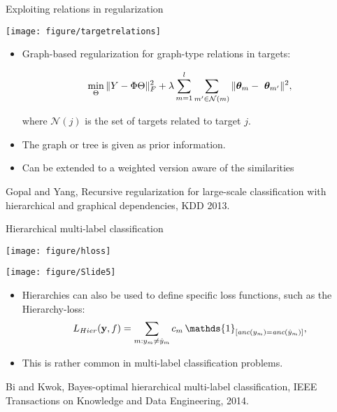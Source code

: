 \documentclass[11pt,compress,t,notes=noshow, xcolor=table]{beamer}
\begin{document}
\begin{frame}{Exploiting relations in regularization}

	\begin{center}
		\texttt{[image: figure/targetrelations]}
	\end{center} 

	\begin{itemize}
		\item Graph-based regularization for graph-type relations in targets: 

		\begin{equation*}
			\min_\Theta \|Y - \Phi \Theta \|^2_F + \lambda \sum_{m=1}^l \sum_{m' \in \mathcal{N}(m)} \|\thetab_m - \ \thetab_{m'}\|^2,
		\end{equation*}

		where $\mathcal{N}(j)$ is the set of targets related to target $j.$
        \item The graph or tree is given as prior information.
		
		\item Can be extended to a weighted version aware of the similarities
	
	\end{itemize}

	{\tiny Gopal and Yang, Recursive regularization for large-scale classification with hierarchical and graphical dependencies, KDD 2013.}
\end{frame}

\begin{frame}{Hierarchical multi-label classification}
	
	\begin{minipage}{0.60\textwidth}  
        \centering
        \texttt{[image: figure/hloss]}
    \end{minipage}
    \hfill
    \begin{minipage}{0.39\textwidth}    
        \centering
		\texttt{[image: figure/Slide5]}
    \end{minipage}
    
    \begin{itemize}
        \item  Hierarchies can also be used to define specific loss functions, such as the Hierarchy-loss: $$L_{Hier}(\yv, f) = \sum_{m: y_m \neq \hat{y}_m} c_m \, \mathds{1}_{ [\textit{anc}(y_m) = \textit{anc}(\hat{y}_m)]  },$$
        \item This is rather common in multi-label classification problems.
    \end{itemize}
    
	{\tiny Bi and Kwok, Bayes-optimal hierarchical multi-label classification, IEEE Transactions on Knowledge and Data Engineering, 2014.}

\end{frame}
\end{document}
